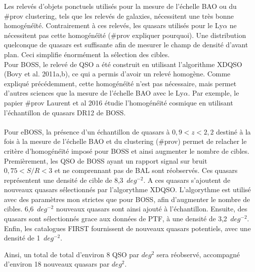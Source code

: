 \documentclass[11pt, twoside, a4paper, openright]{report}
\begin{document}

Les relevés d'objets ponctuels utilisés pour la mesure de l'échelle BAO ou du \#prov clustering, tels que les relevés de galaxies, nécessitent une très bonne homogénéïté. Contrairement à ces relevés, les quasars utilisés pour le Ly$\alpha$ ne nécessitent pas cette homogénéïté (\#prov expliquer pourquoi). Une distribution quelconque de quasars est suffisante afin de mesurer le champ de densité d'avant plan. Ceci simplifie énormément la sélection des cibles. \\
Pour BOSS, le relevé de QSO a été construit en utilisant l'algorithme XDQSO (Bovy et al. 2011a,b), ce qui a permis d'avoir un relevé homogène. Comme expliqué précédemment, cette homogénéïté n'est pas nécessaire, mais permet d'autres sciences que la mesure de l'échelle BAO avec le Ly$\alpha$. Par exemple, le papier \#prov Laurent et al 2016 étudie l'homogénéïté cosmique en utilisant l'échantillon de quasars DR12 de BOSS.


\paragraph{} Pour eBOSS, la présence d'un échantillon de quasars à $0,9 < z < 2,2$ destiné à la fois à la mesure de l'échelle BAO et du clustering (\#prov) permet de relacher le critère d'homogénéïté imposé pour BOSS et ainsi augmenter le nombre de cibles. Premièrement, les QSO de BOSS ayant un rapport signal sur bruit $0,75 < S/R < 3$ et ne comprennant pas de BAL sont réobservés. Ces quasars représentent une densité de cible de 8,3~$deg^{-2}$. A ces quasars s'ajoutent de nouveaux quasars sélectionnés par l'algorythme XDQSO. L'algorythme est utilisé avec des paramètres mon strictes que pour BOSS, afin d'augmenter le nombre de cibles. 6,6~$deg^{-2}$ nouveaux quasars sont ainsi ajouté à l'échantillon. Ensuite, des quasars sont sélectionnés grace aux données de PTF, à une densité de 3,2~$deg^{-2}$. Enfin, les catalogues FIRST fournissent de nouveaux quasars potentiels, avec une densité de 1~$deg^{-2}$.

Ainsi, un total de total d'environ 8 QSO par $deg^{2}$ sera réobservé, accompagné d'environ 18 nouveaux quasars par $deg^{2}$.

\end{document}
